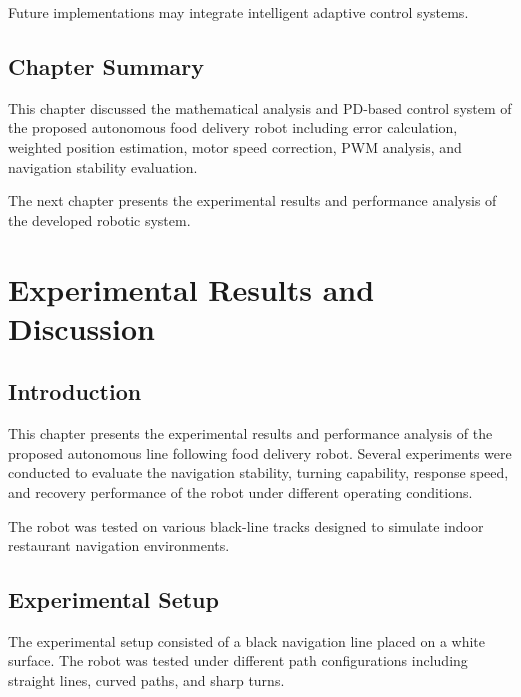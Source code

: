 \documentclass[12pt,a4paper,oneside]{report}
\begin{document}
Future implementations may integrate intelligent adaptive control systems.


\section{Chapter Summary}

This chapter discussed the mathematical analysis and PD-based control system of the proposed autonomous food delivery robot including error calculation, weighted position estimation, motor speed correction, PWM analysis, and navigation stability evaluation.

The next chapter presents the experimental results and performance analysis of the developed robotic system.


\chapter{Experimental Results and Discussion}

\section{Introduction}

This chapter presents the experimental results and performance analysis of the proposed autonomous line following food delivery robot. Several experiments were conducted to evaluate the navigation stability, turning capability, response speed, and recovery performance of the robot under different operating conditions.

The robot was tested on various black-line tracks designed to simulate indoor restaurant navigation environments.


\section{Experimental Setup}

The experimental setup consisted of a black navigation line placed on a white surface. The robot was tested under different path configurations including straight lines, curved paths, and sharp turns.
\end{document}
